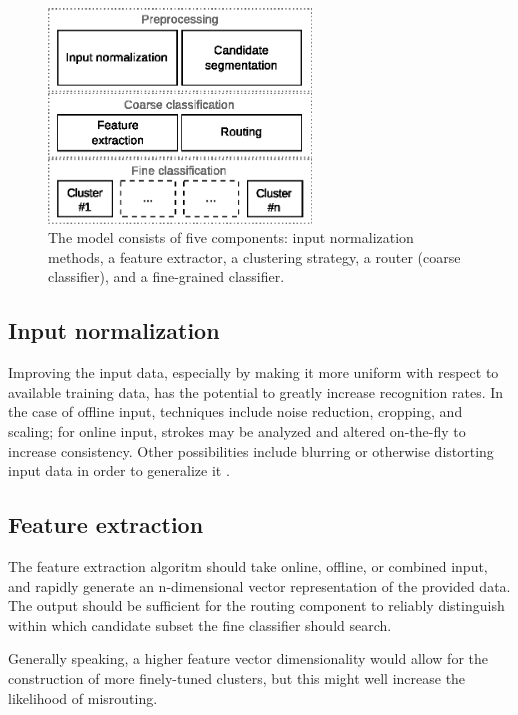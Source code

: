 \documentclass[10pt,conference,a4paper]{IEEEtran}
\begin{document}
	\begin{figure}[b]
		\centering
		\includegraphics[width=2.75in]{./fig/model-overview.eps}
		\caption{The model consists of five components: input normalization methods, a feature extractor,
			a clustering strategy, a router (coarse classifier), and a fine-grained classifier.}
		\label{fig_model_overview}
	\end{figure}


	
	\subsection{Input normalization}

	Improving the input data, especially by making it more uniform with respect to available training data, has the potential
	to greatly increase recognition rates. In the case of offline input, techniques include noise reduction,
	cropping, and scaling; for online input, strokes may be analyzed and altered on-the-fly to increase consistency.
	Other possibilities include blurring or otherwise distorting input data in order to generalize it \cite{razzak2009combining}.



	\subsection{Feature extraction}

	The feature extraction algoritm should take online, offline, or combined input, and rapidly generate
	an n-dimensional vector representation of the provided data. The output should be sufficient for the
	routing component to reliably distinguish within which candidate subset the fine classifier should search.

	Generally speaking, a higher feature vector dimensionality would allow for the construction of more finely-tuned clusters,
	but this might well increase the likelihood of misrouting.%
\end{document}
